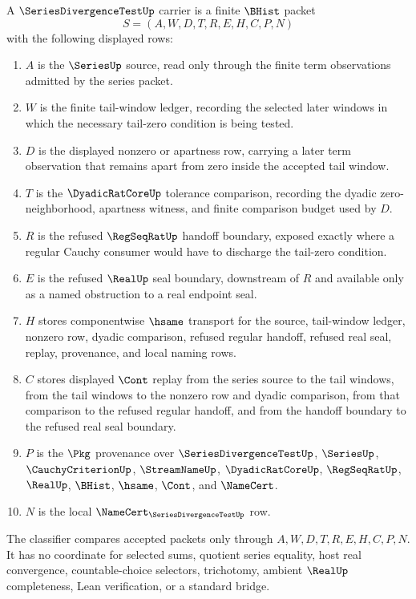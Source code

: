 \begin{definition}\label{def:series-divergence-test-carrier}
A $\SeriesDivergenceTestUp$ carrier is a finite $\BHist$ packet
$$
S=(A,W,D,T,R,E,H,C,P,N)
$$
with the following displayed rows:
\begin{enumerate}
\item $A$ is the $\SeriesUp$ source, read only through the finite term observations admitted by the series packet.
\item $W$ is the finite tail-window ledger, recording the selected later windows in which the necessary tail-zero condition is being tested.
\item $D$ is the displayed nonzero or apartness row, carrying a later term observation that remains apart from zero inside the accepted tail window.
\item $T$ is the $\DyadicRatCoreUp$ tolerance comparison, recording the dyadic zero-neighborhood, apartness witness, and finite comparison budget used by $D$.
\item $R$ is the refused $\RegSeqRatUp$ handoff boundary, exposed exactly where a regular Cauchy consumer would have to discharge the tail-zero condition.
\item $E$ is the refused $\RealUp$ seal boundary, downstream of $R$ and available only as a named obstruction to a real endpoint seal.
\item $H$ stores componentwise $\hsame$ transport for the source, tail-window ledger, nonzero row, dyadic comparison, refused regular handoff, refused real seal, replay, provenance, and local naming rows.
\item $C$ stores displayed $\Cont$ replay from the series source to the tail windows, from the tail windows to the nonzero row and dyadic comparison, from that comparison to the refused regular handoff, and from the handoff boundary to the refused real seal boundary.
\item $P$ is the $\Pkg$ provenance over $\SeriesDivergenceTestUp$, $\SeriesUp$, $\CauchyCriterionUp$, $\StreamNameUp$, $\DyadicRatCoreUp$, $\RegSeqRatUp$, $\RealUp$, $\BHist$, $\hsame$, $\Cont$, and $\NameCert$.
\item $N$ is the local $\NameCert_{\SeriesDivergenceTestUp}$ row.
\end{enumerate}
The classifier compares accepted packets only through $A,W,D,T,R,E,H,C,P,N$. It has no coordinate for selected sums, quotient series equality, host real convergence, countable-choice selectors, trichotomy, ambient $\RealUp$ completeness, Lean verification, or a standard bridge.
\end{definition}

